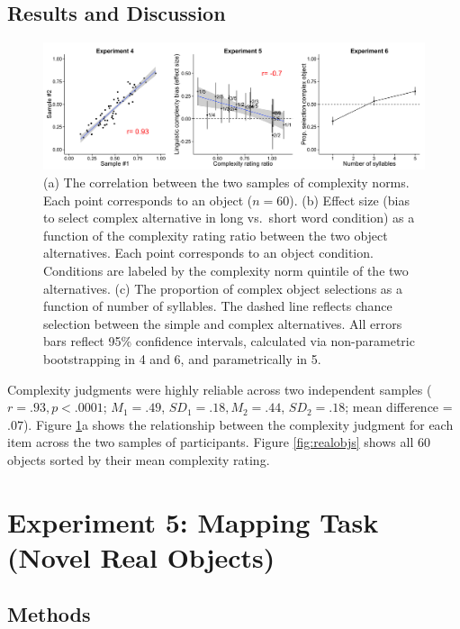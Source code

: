 \subsection{Results and Discussion}

 \begin{figure} [t]
 \begin{center}
  \includegraphics[width=6in]{figs/study2_plots.png}
  \caption{\label{fig:study2_plots} (a) The correlation between the two samples of complexity norms. Each point corresponds to an object ($n = 60$). (b) Effect size (bias to select complex alternative in long vs.\ short word condition) as a function of the complexity rating ratio between the two object alternatives. Each point corresponds to an object condition. Conditions are labeled by the complexity norm quintile of the two alternatives. (c) The proportion of complex object selections as a function of number of syllables. The dashed line reflects chance selection between the simple and complex alternatives. All errors bars reflect 95\% confidence intervals, calculated via non-parametric bootstrapping in 4 and 6, and parametrically in 5.}
 \end{center}
\end{figure}
 Complexity judgments were highly reliable across two independent samples ($r = .93, p < .0001$; $M_1 = .49$, $SD_1 = .18, M_2 = .44$, $SD_2 = .18$; mean difference = $.07$). Figure \ref{fig:study2_plots}a shows the relationship between the complexity judgment for each item across the two samples of participants. Figure \ref{fig:realobjs} shows all 60 objects sorted by their mean complexity rating.

\section{Experiment 5: Mapping Task (Novel Real Objects)}
\label{ch2-5}

\subsection{Methods}
